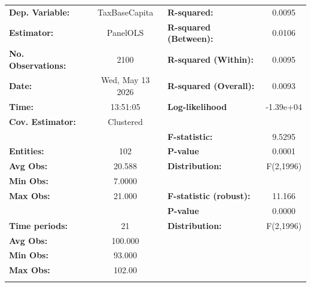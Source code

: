 \begin{center}
\begin{tabular}{lclc}
\toprule
\textbf{Dep. Variable:}          &   TaxBaseCapita    & \textbf{  R-squared:         }   &      0.0095      \\
\textbf{Estimator:}              &      PanelOLS      & \textbf{  R-squared (Between):}  &      0.0106      \\
\textbf{No. Observations:}       &        2100        & \textbf{  R-squared (Within):}   &      0.0095      \\
\textbf{Date:}                   &  Wed, May 13 2026  & \textbf{  R-squared (Overall):}  &      0.0093      \\
\textbf{Time:}                   &      13:51:05      & \textbf{  Log-likelihood     }   &    -1.39e+04     \\
\textbf{Cov. Estimator:}         &     Clustered      & \textbf{                     }   &                  \\
\textbf{}                        &                    & \textbf{  F-statistic:       }   &      9.5295      \\
\textbf{Entities:}               &        102         & \textbf{  P-value            }   &      0.0001      \\
\textbf{Avg Obs:}                &       20.588       & \textbf{  Distribution:      }   &    F(2,1996)     \\
\textbf{Min Obs:}                &       7.0000       & \textbf{                     }   &                  \\
\textbf{Max Obs:}                &       21.000       & \textbf{  F-statistic (robust):} &      11.166      \\
\textbf{}                        &                    & \textbf{  P-value            }   &      0.0000      \\
\textbf{Time periods:}           &         21         & \textbf{  Distribution:      }   &    F(2,1996)     \\
\textbf{Avg Obs:}                &      100.000       & \textbf{                     }   &                  \\
\textbf{Min Obs:}                &       93.000       & \textbf{                     }   &                  \\
\textbf{Max Obs:}                &       102.00       & \textbf{                     }   &                  \\
\textbf{}                        &                    & \textbf{                     }   &                  \\

\end{tabular}
\end{center}
